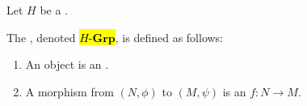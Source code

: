 \begin{definition} \label{definition:category_of_H_groups_for_a_fixed_group}
    Let $H$ be a .

    The , denoted \hl{$H\text{-}\mathbf{Grp}$}, is defined as follows:
    \begin{enumerate}
        \item An object is an .
        \item A morphism from $(N, \phi)$ to $(M, \psi)$ is an  $f: N \to M$.
    \end{enumerate}
\end{definition}

